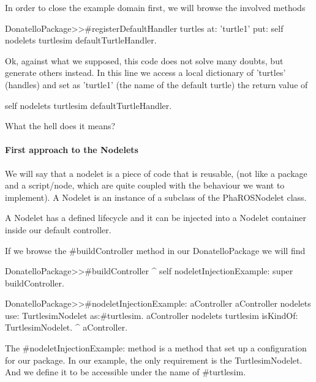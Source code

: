 \documentclass[a4paper,10pt,twoside]{book}
\begin{document}
			
			
			In order to close the example domain first, we will browse the involved methods
			

			\begin{code}
DonatelloPackage>>#registerDefaultHandler
	turtles at: 'turtle1' put: self nodelets turtlesim defaultTurtleHandler.
			\end{code}

			Ok, against what we supposed, this code does not solve many doubts, but generate others instead. In this line we access a local dictionary of 'turtles' (handles) and set as 'turtle1' (the name of the default turtle) the return value of 
			
			\begin{code}
self nodelets turtlesim defaultTurtleHandler. 
			\end{code}
			
			What the hell does it means? 
			
			\paragraph{First approach to the Nodelets\newline\newline} 
			
			We will say that a nodelet is a piece of code that is reusable, (not like a package and a script/node, which are quite coupled with the behaviour we want to implement). 
			A Nodelet is an instance of a subclass of the PhaROSNodelet class. 
			
			A Nodelet has a defined lifecycle and it can be injected into a Nodelet container inside our default controller. 
			
			
			If we browse the \#buildController method in our DonatelloPackage we will find
			
			\begin{code}
DonatelloPackage>>#buildController
	^ self nodeletInjectionExample: super buildController.
	
DonatelloPackage>>#nodeletInjectionExample: aController
	aController nodelets use: TurtlesimNodelet as:#turtlesim.
	aController nodelets turtlesim isKindOf: TurtlesimNodelet.
	^ aController.		
			\end{code}
			
			The \#nodeletInjectionExample: method is a method that set up a configuration for our package. In our example, the only requirement is the TurtlesimNodelet. And we define it to be accessible under the name of \#turtlesim. 
			
\end{document}
